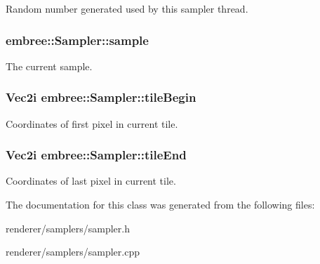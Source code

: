 Random number generated used by this sampler thread. 

\hypertarget{classembree_1_1_sampler_a69bf7ba758fa6d8b48986ab8f4dbd682}{
\subsubsection[{sample}]{ {\bf embree::Sampler::sample}}}
\label{classembree_1_1_sampler_a69bf7ba758fa6d8b48986ab8f4dbd682}


The current sample. 

\hypertarget{classembree_1_1_sampler_abf235b415b0617f18908ab5488b14aab}{
\subsubsection[{tileBegin}]{\setlength{\rightskip}{0pt plus 5cm}Vec2i {\bf embree::Sampler::tileBegin}}}
\label{classembree_1_1_sampler_abf235b415b0617f18908ab5488b14aab}


Coordinates of first pixel in current tile. 

\hypertarget{classembree_1_1_sampler_aeab1cdc06154d519f670138ed5d16298}{
\subsubsection[{tileEnd}]{\setlength{\rightskip}{0pt plus 5cm}Vec2i {\bf embree::Sampler::tileEnd}}}
\label{classembree_1_1_sampler_aeab1cdc06154d519f670138ed5d16298}


Coordinates of last pixel in current tile. 



The documentation for this class was generated from the following files:\begin{DoxyCompactItemize}
\item 
renderer/samplers/sampler.h\item 
renderer/samplers/sampler.cpp\end{DoxyCompactItemize}
